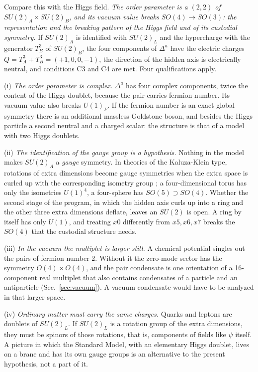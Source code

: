 Compare this with the Higgs field. \emph{The order parameter is a $(2,2)$ of
$SU(2)_A\times SU(2)_B$, and its vacuum value breaks $SO(4)\to SO(3)$: the representation and the
breaking pattern of the Higgs field and of its custodial symmetry.} If $SU(2)_A$ is identified with
$SU(2)_L$ and the hypercharge with the generator $T^3_B$ of $SU(2)_B$, the four components of
$\Delta^a$ have the electric charges $Q=T^3_A+T^3_B=(+1,0,0,-1)$, the direction of the hidden axis is
electrically neutral, and conditions C3 and C4 are met. Four qualifications apply.

(i) \emph{The order parameter is complex.} $\Delta^a$ has four complex components, twice the content
of the Higgs doublet, because the pair carries fermion number. Its vacuum value also breaks $U(1)_F$.
If the fermion number is an exact global symmetry there is an additional massless Goldstone boson,
and besides the Higgs particle a second neutral and a charged scalar: the structure is that of a model
with two Higgs doublets.

(ii) \emph{The identification of the gauge group is a hypothesis.} Nothing in the model makes
$SU(2)_A$ a \emph{gauge} symmetry. In theories of the Kaluza-Klein type, rotations of extra
dimensions become gauge symmetries when the extra space is curled up with the corresponding isometry
group \cite{Witten1981}; a four-dimensional torus has only the isometries $U(1)^4$, a four-sphere
has $SO(5)\supset SO(4)$. Whether the second stage of the program, in which the hidden axis curls up
into a ring and the other three extra dimensions deflate, leaves an $SU(2)$ is open. A ring by itself
has only $U(1)$, and treating $x0$ differently from $x5,x6,x7$ breaks the $SO(4)$ that the custodial
structure needs.

(iii) \emph{In the vacuum the multiplet is larger still.} A chemical potential singles out the pairs
of fermion number 2. Without it the zero-mode sector has the symmetry $O(4)\times O(4)$, and the pair
condensate is one orientation of a 16-component real multiplet that also contains condensates of a
particle and an antiparticle (Sec.~\ref{sec:vacuum}). A vacuum condensate would have to be analyzed
in that larger space.

(iv) \emph{Ordinary matter must carry the same charges.} Quarks and leptons are doublets of $SU(2)_L$.
If $SU(2)_L$ is a rotation group of the extra dimensions, they must be spinors of those rotations,
that is, components of fields like $\psi$ itself. A picture in which the Standard Model, with an
elementary Higgs doublet, lives on a brane and has its own gauge groups is an alternative to the
present hypothesis, not a part of it.

